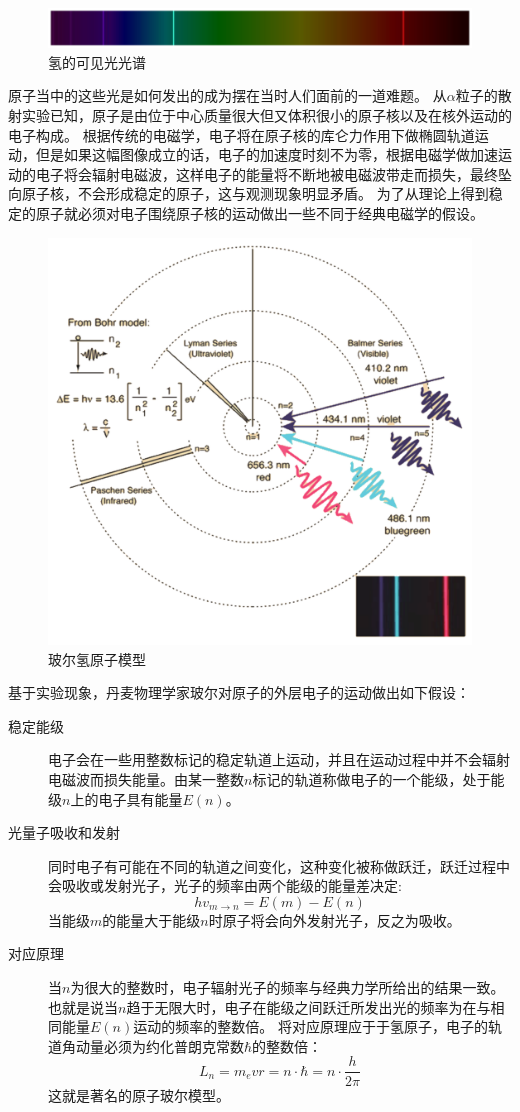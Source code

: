 \begin{figure}[ht]
\centering
\includegraphics[width=0.7\linewidth]{images/particle-12}
\caption{氢的可见光光谱}
\label{fig:particle-12}
\end{figure}


原子当中的这些光是如何发出的成为摆在当时人们面前的一道难题。
从$\alpha$粒子的散射实验已知，原子是由位于中心质量很大但又体积很小的原子核以及在核外运动的电子构成。
根据传统的电磁学，电子将在原子核的库仑力作用下做椭圆轨道运动，但是如果这幅图像成立的话，电子的加速度时刻不为零，根据电磁学做加速运动的电子将会辐射电磁波，这样电子的能量将不断地被电磁波带走而损失，最终坠向原子核，不会形成稳定的原子，这与观测现象明显矛盾。
为了从理论上得到稳定的原子就必须对电子围绕原子核的运动做出一些不同于经典电磁学的假设。

\begin{figure}[!b]
\centering
\includegraphics[width=0.5\linewidth]{images/particle-13}
\caption{玻尔氢原子模型}
\label{fig:particle-13}
\end{figure}

基于实验现象，丹麦物理学家玻尔对原子的外层电子的运动做出如下假设：
\begin{description}
\item[稳定能级] 电子会在一些用整数标记的稳定轨道上运动，并且在运动过程中并不会辐射电磁波而损失能量。由某一整数$n$标记的轨道称做电子的一个能级，处于能级$n$上的电子具有能量$E(n)$。
\item [光量子吸收和发射]同时电子有可能在不同的轨道之间变化，这种变化被称做跃迁，跃迁过程中会吸收或发射光子，光子的频率由两个能级的能量差决定:
\begin{equation}
hv_{m\rightarrow n}=E(m)-E(n)
\end{equation}
当能级$m$的能量大于能级$n$时原子将会向外发射光子，反之为吸收。
\item[对应原理] 当$n$为很大的整数时，电子辐射光子的频率与经典力学所给出的结果一致。
也就是说当$n$趋于无限大时，电子在能级之间跃迁所发出光的频率为在与相同能量$E(n)$运动的频率的整数倍。
将对应原理应于于氢原子，电子的轨道角动量必须为约化普朗克常数$\hbar$的整数倍：
\begin{equation}\label{eqn: 近代物理，玻尔轨道条件}
L_n = m_evr = n\cdot\hbar=n\cdot\frac{h}{2\pi}
\end{equation}
这就是著名的原子玻尔模型。
\end{description}





